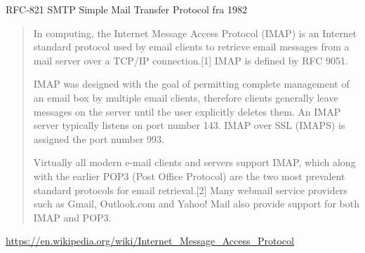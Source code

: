 \documentclass[Screen16to9,17pt]{foils}
\begin{document}
\begin{list2}
\item RFC-821 SMTP Simple Mail Transfer Protocol fra 1982
\item {}
\end{list2}



\begin{quote}
In computing, the Internet Message Access Protocol (IMAP) is an Internet standard protocol used by email clients to retrieve email messages from a mail server over a TCP/IP connection.[1] IMAP is defined by RFC 9051.

IMAP was designed with the goal of permitting complete management of an email box by multiple email clients, therefore clients generally leave messages on the server until the user explicitly deletes them. An IMAP server typically listens on port number 143. IMAP over SSL (IMAPS) is assigned the port number 993.

Virtually all modern e-mail clients and servers support IMAP, which along with the earlier POP3 (Post Office Protocol) are the two most prevalent standard protocols for email retrieval.[2] Many webmail service providers such as Gmail, Outlook.com and Yahoo! Mail also provide support for both IMAP and POP3.
\end{quote}

\url{https://en.wikipedia.org/wiki/Internet_Message_Access_Protocol}




\end{document}
